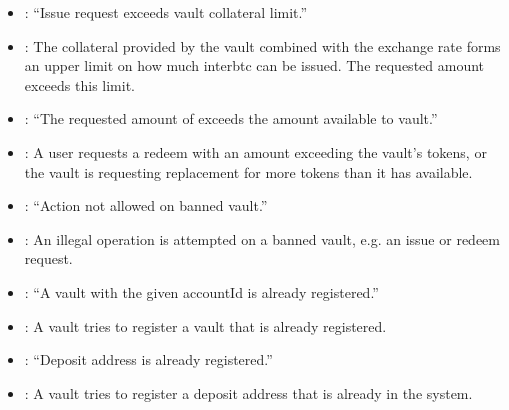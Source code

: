 \documentclass[a4paper,10pt,english]{sphinxmanual}
\begin{document}
\begin{itemize}
\item {} 
: “Issue request exceeds vault collateral limit.”

\item {} 
: The collateral provided by the vault combined with the exchange rate forms an upper limit on how much interbtc can be issued. The requested amount exceeds this limit.

\end{itemize}

\begin{itemize}
\item {} 
: “The requested amount of  exceeds the amount available to vault.”

\item {} 
: A user requests a redeem with an amount exceeding the vault’s tokens, or the vault is requesting replacement for more tokens than it has available.

\end{itemize}

\begin{itemize}
\item {} 
: “Action not allowed on banned vault.”

\item {} 
: An illegal operation is attempted on a banned vault, e.g. an issue or redeem request.

\end{itemize}

\begin{itemize}
\item {} 
: “A vault with the given accountId is already registered.”

\item {} 
: A vault tries to register a vault that is already registered.

\end{itemize}

\begin{itemize}
\item {} 
: “Deposit address is already registered.”

\item {} 
: A vault tries to register a deposit address that is already in the system.

\end{itemize}
\end{document}
